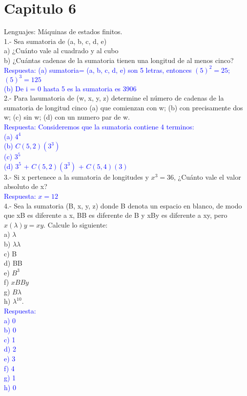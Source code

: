 \documentclass{article}
\begin{document}
\section{Capitulo 6}Lenguajes: Máquinas de estados finitos.\\
1.-  Sea sumatoria de (a, b, c, d, e)\\
a) ¿Cuánto vale al cuadrado y al cubo \\b) ¿Cuántas cadenas de la sumatoria tienen una longitud de al menos cinco? \\ 
\textcolor{blue}{Respuesta: (a) sumatoria= (a, b, c, d, e) 
son 5 letras, entonces $(5)^2= 25$; $(5)^3 = 125$ \\ 
(b) De i = 0 hasta 5 es la sumatoria es 3906}\\
2.- Para lasumatoria de (w, x, y, z)
determine el número de cadenas de la  sumatoria de longitud cinco (a) que comienzan con w; (b) con precisamente dos w; (c) sin w; (d) con un numero par de w. \\
\textcolor{blue}{Respuesta: Consideremos que la sumatoria contiene 4 terminos:\\ (a) $4^4$ \\
(b) $C(5,2)(3^3)$\\
(c) $3^5$ \\
(d) $3^5$ + $C(5,2)(3^3)$ + $C(5,4)(3)$
}
\\
3.- Si x pertenece a la  sumatoria de longitudes y $x^3=36$, ¿Cuánto vale el valor absoluto de x? \\
\textcolor{blue}{ Respuesta:  $x = 12$ }
\\
4.- Sea la  sumatoria (B, x, y, z) donde B denota un espacio en blanco, de modo que xB es diferente a x, BB es diferente de B y xBy es diferente a xy, pero $x(\lambda)y= xy$. Calcule lo siguiente: \\
a) $\lambda$ \\ b)  $\lambda\lambda$\\ c) B  \\d) BB \\ e) $B^3$\\  f) $xBBy$\\  g) $B\lambda$ \\ h) $\lambda^{10}$.  \\
\textcolor{blue}{Respuesta:\\ a) 0 \\ b) 0 \\ c) 1 \\ d) 2\\  e) 3 \\ f) 4 \\ g) 1 \\ h) 0  }
\end{document}
